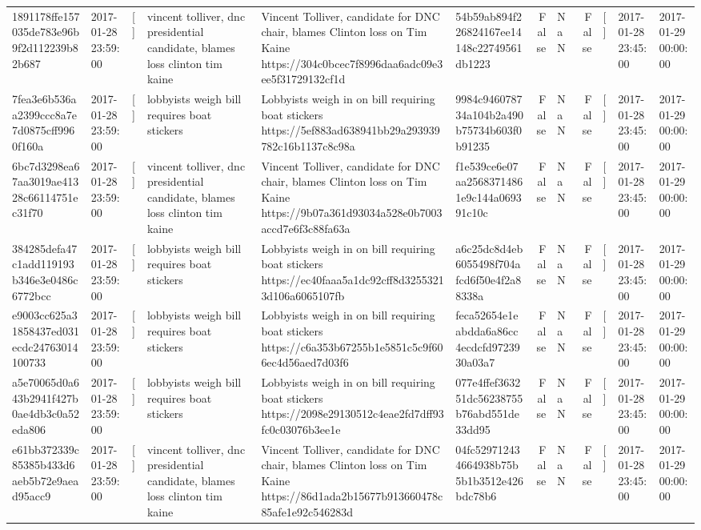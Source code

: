 \begin{tabular}{llllllrlrlll}
1891178ffe157035de783e96b9f2d112239b82b687 & 2017-01-28 23:59:00 & [] & vincent tolliver, dnc presidential candidate, blames loss clinton tim kaine & Vincent Tolliver, candidate for DNC chair, blames Clinton loss on Tim Kaine https://304c0bcec7f8996daa6adc09e3ee5f31729132cf1d & 54b59ab894f226824167ee14148c22749561db1223 & False & NaN & False & [] & 2017-01-28 23:45:00 & 2017-01-29 00:00:00 \\
7fea3e6b536aa2399ccc8a7e7d0875cff9960f160a & 2017-01-28 23:59:00 & [] & lobbyists weigh bill requires boat stickers & Lobbyists weigh in on bill requiring boat stickers https://5ef883ad638941bb29a293939782c16b1137c8c98a & 9984c946078734a104b2a490b75734b603f0b91235 & False & NaN & False & [] & 2017-01-28 23:45:00 & 2017-01-29 00:00:00 \\
6bc7d3298ea67aa3019ae41328c66114751ec31f70 & 2017-01-28 23:59:00 & [] & vincent tolliver, dnc presidential candidate, blames loss clinton tim kaine & Vincent Tolliver, candidate for DNC chair, blames Clinton loss on Tim Kaine https://9b07a361d93034a528e0b7003accd7e6f3c88fa63a & f1e539ce6e07aa25683714861e9c144a069391c10c & False & NaN & False & [] & 2017-01-28 23:45:00 & 2017-01-29 00:00:00 \\
384285defa47c1add119193b346e3e0486c6772bcc & 2017-01-28 23:59:00 & [] & lobbyists weigh bill requires boat stickers & Lobbyists weigh in on bill requiring boat stickers https://ec40faaa5a1dc92cff8d32553213d106a6065107fb & a6c25dc8d4eb6055498f704afcd6f50e4f2a88338a & False & NaN & False & [] & 2017-01-28 23:45:00 & 2017-01-29 00:00:00 \\
e9003cc625a31858437ed031ecdc24763014100733 & 2017-01-28 23:59:00 & [] & lobbyists weigh bill requires boat stickers & Lobbyists weigh in on bill requiring boat stickers https://c6a353b67255b1e5851c5c9f606ec4d56aed7d03f6 & feca52654e1eabdda6a86cc4ecdcfd9723930a03a7 & False & NaN & False & [] & 2017-01-28 23:45:00 & 2017-01-29 00:00:00 \\
a5e70065d0a643b2941f427b0ae4db3c0a52eda806 & 2017-01-28 23:59:00 & [] & lobbyists weigh bill requires boat stickers & Lobbyists weigh in on bill requiring boat stickers https://2098e29130512c4eae2fd7dff93fc0c03076b3ee1e & 077e4ffef363251dc56238755b76abd551de33dd95 & False & NaN & False & [] & 2017-01-28 23:45:00 & 2017-01-29 00:00:00 \\
e61bb372339c85385b433d6aeb5b72e9aead95acc9 & 2017-01-28 23:59:00 & [] & vincent tolliver, dnc presidential candidate, blames loss clinton tim kaine & Vincent Tolliver, candidate for DNC chair, blames Clinton loss on Tim Kaine https://86d1ada2b15677b913660478c85afe1e92c546283d & 04fc529712434664938b75b5b1b3512e426bdc78b6 & False & NaN & False & [] & 2017-01-28 23:45:00 & 2017-01-29 00:00:00 \\

\end{tabular}
